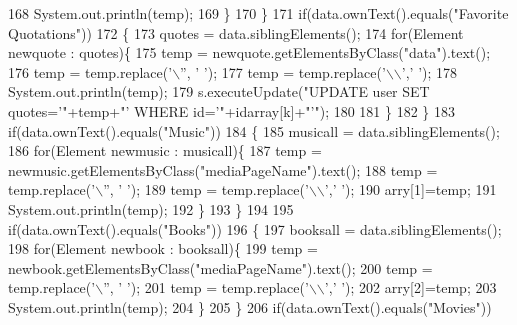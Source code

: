 \begin{DoxyCode}
168                     System.out.println(temp);
169                 \}
170                 \}
171                 \textcolor{keywordflow}{if}(data.ownText().equals(\textcolor{stringliteral}{"Favorite Quotations"}))
172                 \{
173                     quotes = data.siblingElements();
174                 \textcolor{keywordflow}{for}(Element newquote : quotes)\{
175                     temp = newquote.getElementsByClass(\textcolor{stringliteral}{"data"}).text();
176                     temp = temp.replace(\textcolor{charliteral}{'\(\backslash\)''}, \textcolor{charliteral}{' '});
177                     temp = temp.replace(\textcolor{charliteral}{'\(\backslash\)\(\backslash\)'},\textcolor{charliteral}{' '});
178                     System.out.println(temp);
179                     s.executeUpdate(\textcolor{stringliteral}{"UPDATE user SET quotes='"}+temp+\textcolor{stringliteral}{"' WHERE id='"}+idarray[k]+\textcolor{stringliteral}{"'"});
180                     
181                 \}
182                 \}
183                 \textcolor{keywordflow}{if}(data.ownText().equals(\textcolor{stringliteral}{"Music"}))
184                 \{
185                     musicall = data.siblingElements();
186                 \textcolor{keywordflow}{for}(Element newmusic : musicall)\{
187                     temp = newmusic.getElementsByClass(\textcolor{stringliteral}{"mediaPageName"}).text();
188                     temp = temp.replace(\textcolor{charliteral}{'\(\backslash\)''}, \textcolor{charliteral}{' '});
189                     temp = temp.replace(\textcolor{charliteral}{'\(\backslash\)\(\backslash\)'},\textcolor{charliteral}{' '});
190                     arry[1]=temp;
191                     System.out.println(temp);
192                 \}
193                 \}
194                 
195                 \textcolor{keywordflow}{if}(data.ownText().equals(\textcolor{stringliteral}{"Books"}))
196                 \{
197                     booksall = data.siblingElements();
198                 \textcolor{keywordflow}{for}(Element newbook : booksall)\{
199                     temp = newbook.getElementsByClass(\textcolor{stringliteral}{"mediaPageName"}).text();
200                     temp = temp.replace(\textcolor{charliteral}{'\(\backslash\)''}, \textcolor{charliteral}{' '});
201                     temp = temp.replace(\textcolor{charliteral}{'\(\backslash\)\(\backslash\)'},\textcolor{charliteral}{' '});
202                     arry[2]=temp;
203                     System.out.println(temp);
204                 \}
205                 \}
206                 \textcolor{keywordflow}{if}(data.ownText().equals(\textcolor{stringliteral}{"Movies"}))

\end{DoxyCode}
